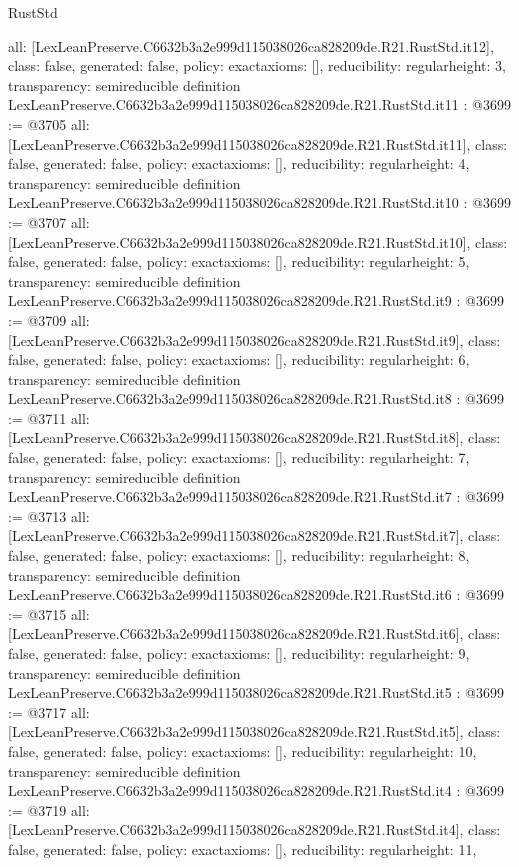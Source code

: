 \begin{lexlean}{RustStd}
\begin{coremodule}
{  all: [LexLeanPreserve.C6632b3a2e999d115038026ca828209de.R21.RustStd.it12],
  class: false,
  generated: false,
  policy: exact{axioms: []},
  reducibility: regular{height: 3},
  transparency: semireducible
}
definition LexLeanPreserve.C6632b3a2e999d115038026ca828209de.R21.RustStd.it11 : @3699 := @3705 {
  all: [LexLeanPreserve.C6632b3a2e999d115038026ca828209de.R21.RustStd.it11],
  class: false,
  generated: false,
  policy: exact{axioms: []},
  reducibility: regular{height: 4},
  transparency: semireducible
}
definition LexLeanPreserve.C6632b3a2e999d115038026ca828209de.R21.RustStd.it10 : @3699 := @3707 {
  all: [LexLeanPreserve.C6632b3a2e999d115038026ca828209de.R21.RustStd.it10],
  class: false,
  generated: false,
  policy: exact{axioms: []},
  reducibility: regular{height: 5},
  transparency: semireducible
}
definition LexLeanPreserve.C6632b3a2e999d115038026ca828209de.R21.RustStd.it9 : @3699 := @3709 {
  all: [LexLeanPreserve.C6632b3a2e999d115038026ca828209de.R21.RustStd.it9],
  class: false,
  generated: false,
  policy: exact{axioms: []},
  reducibility: regular{height: 6},
  transparency: semireducible
}
definition LexLeanPreserve.C6632b3a2e999d115038026ca828209de.R21.RustStd.it8 : @3699 := @3711 {
  all: [LexLeanPreserve.C6632b3a2e999d115038026ca828209de.R21.RustStd.it8],
  class: false,
  generated: false,
  policy: exact{axioms: []},
  reducibility: regular{height: 7},
  transparency: semireducible
}
definition LexLeanPreserve.C6632b3a2e999d115038026ca828209de.R21.RustStd.it7 : @3699 := @3713 {
  all: [LexLeanPreserve.C6632b3a2e999d115038026ca828209de.R21.RustStd.it7],
  class: false,
  generated: false,
  policy: exact{axioms: []},
  reducibility: regular{height: 8},
  transparency: semireducible
}
definition LexLeanPreserve.C6632b3a2e999d115038026ca828209de.R21.RustStd.it6 : @3699 := @3715 {
  all: [LexLeanPreserve.C6632b3a2e999d115038026ca828209de.R21.RustStd.it6],
  class: false,
  generated: false,
  policy: exact{axioms: []},
  reducibility: regular{height: 9},
  transparency: semireducible
}
definition LexLeanPreserve.C6632b3a2e999d115038026ca828209de.R21.RustStd.it5 : @3699 := @3717 {
  all: [LexLeanPreserve.C6632b3a2e999d115038026ca828209de.R21.RustStd.it5],
  class: false,
  generated: false,
  policy: exact{axioms: []},
  reducibility: regular{height: 10},
  transparency: semireducible
}
definition LexLeanPreserve.C6632b3a2e999d115038026ca828209de.R21.RustStd.it4 : @3699 := @3719 {
  all: [LexLeanPreserve.C6632b3a2e999d115038026ca828209de.R21.RustStd.it4],
  class: false,
  generated: false,
  policy: exact{axioms: []},
  reducibility: regular{height: 11},
}
\end{coremodule}
\end{lexlean}
